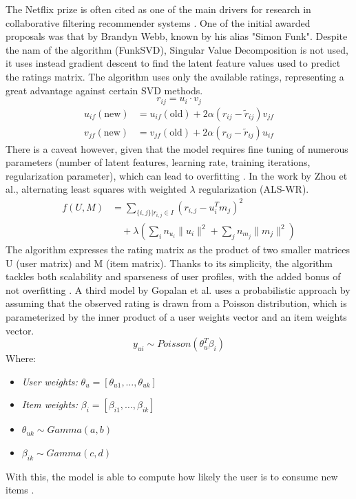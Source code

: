 \documentclass[conference]{IEEEtran}
\begin{document}
The Netflix prize is often cited as one of the main drivers for research in collaborative filtering recommender systems \cite{netflix_prize_2009}. One of the initial awarded proposals was that by Brandyn Webb, known by his alias "Simon Funk". Despite the nam of the algorithm (FunkSVD), Singular Value Decomposition is not used, it uses instead gradient descent to find the latent feature values used to predict the ratings matrix. The algorithm uses only the available ratings, representing a great advantage against certain SVD methods.
\begin{equation}
r_{ij} = u_i \cdot v_j
\end{equation}
\begin{align}
u_{if}(\text{new}) &= u_{if}(\text{old}) + 2\alpha(r_{ij} - \tilde{r}_{ij})v_{jf} \\
v_{jf}(\text{new}) &= v_{jf}(\text{old}) + 2\alpha(r_{ij} - \tilde{r}_{ij})u_{if}
\end{align}
There is a caveat however, given that the model requires fine tuning of numerous parameters (number of latent features, learning rate, training iterations, regularization parameter), which can lead to overfitting \cite{Funk2006}. In the work by Zhou et al., alternating least squares with weighted  $\lambda$ regularization (ALS-WR). 
\begin{align}
f(U, M) &= \sum_{\{i, j\} | r_{i,j} \in I} \left( r_{i,j} - u_i^T m_j \right)^2 \nonumber \\
&\quad + \lambda \left( \sum_i n_{u_i} \| u_i \|^2 + \sum_j n_{m_j} \| m_j \|^2 \right)
\end{align}
The algorithm expresses the rating matrix as the product of two smaller matrices U (user matrix) and M (item matrix). Thanks to its simplicity, the algorithm tackles both scalability and sparseness of user profiles, with the added bonus of not overfitting \cite{10.1007/978-3-540-68880-8_32}. A third model by Gopalan et al. uses a probabilistic approach by assuming that the observed rating is drawn from a Poisson distribution, which is parameterized by the inner product of a user weights vector and an item weights vector. 
\begin{equation}
y_{ui} \sim Poisson(\theta_u^T \beta_i)
\end{equation}
\noindent
Where:
\begin{itemize}
    \renewcommand{\labelitemi}{~} %
    \item \textit{User weights:} $\theta_u = [\theta_{u1}, \dots, \theta_{uk}]$
    \item \textit{Item weights:} $\beta_i = [\beta_{i1}, \dots, \beta_{ik}]$
    \item $\theta_{uk} \sim Gamma(a, b)$
    \item $\beta_{ik} \sim Gamma(c, d)$
\end{itemize}
With this, the model is able to compute how likely the user is to consume new items \cite{gopalan2014scalablerecommendationpoissonfactorization}.
\end{document}
